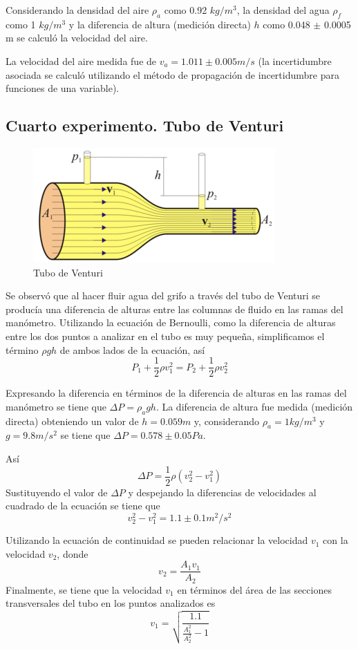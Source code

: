 \documentclass[10pt,a4paper]{article}
\begin{document}
Considerando la densidad del aire $\rho_a$ como 0.92 $kg/m^3$, la densidad del agua $\rho_f$ como 1 $kg/m^3$ y la diferencia de altura (medición directa) $h$ como 0.048 $\pm$ 0.0005 m se calculó la velocidad del aire.

La velocidad del aire medida fue de $v_a = 1.011 \pm 0.005 m/s$ (la incertidumbre asociada se calculó utilizando el método de propagación de incertidumbre para funciones de una variable).

\subsection*{Cuarto experimento. Tubo de Venturi}
\begin{figure}[H]
\includegraphics[scale=1.4]{venturi.png}
\centering
\caption{Tubo de Venturi}
\end{figure}


Se observó que al hacer fluir agua del grifo a través del tubo de Venturi se producía una diferencia de alturas entre las columnas de fluido en las ramas del manómetro.
Utilizando la ecuación de Bernoulli, como la diferencia de alturas entre los dos puntos a analizar en el tubo es muy pequeña, simplificamos el término $\rho g h$ de ambos lados de la ecuación, así $$ P_1 + \frac{1}{2} \rho v^{2}_1 = P_2 + \frac{1}{2} \rho v^{2}_2 $$ 

Expresando la diferencia en términos de la diferencia de alturas en las ramas del manómetro se tiene que $\Delta P=\rho_a g h$. La diferencia de altura fue medida (medición directa) obteniendo un valor de $h=0.059 m$ y, considerando $\rho_a = 1 kg/m^3$ y $g=9.8m/s^2$ se tiene que $\Delta P = 0.578 \pm 0.05 Pa$.

Así $$\Delta P = \frac{1}{2}\rho (v^{2}_2 -v^2_1) $$
Sustituyendo el valor de $\Delta P$ y despejando la diferencias de velocidades al cuadrado de la ecuación se tiene que $$ v^{2}_2 -v^2_1 = 1.1 \pm 0.1 m^2/s^2 $$

Utilizando la ecuación de continuidad se pueden relacionar la velocidad $v_1$ con la velocidad $v_2$, donde $$ v_2 = \frac{A_1 v_1}{A_2}$$
Finalmente, se tiene que la velocidad $v_1$ en términos del área de las secciones transversales del tubo en los puntos analizados es $$ v_1 = \sqrt{\frac{1.1}{\frac{A^{2}_1}{A^{2}_2}-1}} $$
\end{document}
